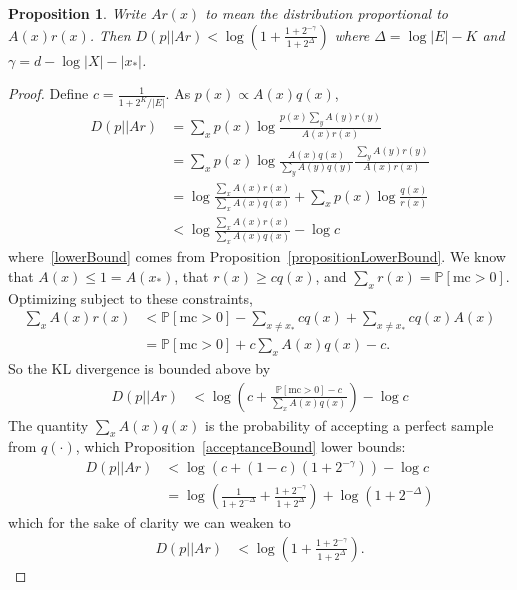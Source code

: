 \documentclass{article}
\newcommand{\Probability}{\mathds{P}} %
\newtheorem{proposition}{Proposition}
\begin{document}
  \begin{proposition}\label{mainResult}
    Write $Ar(x)$ to mean the distribution  proportional to $A(x)r(x)$. Then $D(p||Ar)<\log \left( 1 + \frac{1 + 2^{ - \gamma}}{1 + 2^\Delta}\right)$ where
    $\Delta = \log |E| - K$ and $\gamma = d - \log |X| - \lvert x_* \rvert $.
  \end{proposition}
  \begin{proof}
      Define $c=\frac{1}{1 + 2^K/|E|}$. As $p(x)\propto A(x)q(x)$,
    \begin{align}
      D(p||Ar)& = \sum_x p(x)\log \frac{p(x)\sum_y A(y)r(y)}{A(x)r(x)}\\
      & = \sum_x p(x)\log \frac{A(x)q(x)}{\sum_y A(y)q(y)}\frac{\sum_y A(y)r(y)}{A(x)r(x)} \\ %
      & = \log \frac{\sum_x A(x)r(x)}{\sum_x A(x)q(x)} + \sum_x p(x)\log \frac{q(x)}{r(x)}\\
      &  < \log \frac{\sum_x A(x)r(x)}{\sum_x A(x)q(x)} - \log c\label{lowerBound}
    \end{align}
    where~\ref{lowerBound} comes from Proposition~\ref{propositionLowerBound}.
    We know that $A(x)\leq 1 = A(x_*)$, that $r(x) \geq c q(x)$, and $\sum_x r(x) = \Probability [\text{mc} > 0 ]$.
    Optimizing subject to these constraints,
    \begin{align}
      \sum_x A(x) r(x) &  < \Probability [\text{mc} > 0] - \sum_{x\not= x_*} cq(x) +\sum_{x\not= x_*} cq(x)A(x)\nonumber\\
      & = \Probability [\text{mc} > 0 ] + c \sum_{x} A(x) q(x) - c.
    \end{align}
    So the KL divergence is bounded above by
    \begin{align}
      D(p||Ar)&  < \log \left( c + \frac{\Probability [\text{mc} > 0] -c }{\sum_x A(x)q(x)}\right) - \log c
    \end{align}
    The quantity $\sum_x A(x)q(x)$ is the probability of accepting a perfect sample from $q(\cdot )$,
    which Proposition~\ref{acceptanceBound} lower bounds:
    \begin{align}
      D(p||Ar)&  < \log \left( c + (1 -c)(1 + 2^{ - \gamma})\right) - \log c\\
      & = \log \left( \frac{1}{1 + 2^{ - \Delta}} + \frac{1 + 2^{ - \gamma}}{1 + 2^\Delta}\right)  + \log (1 + 2^{ - \Delta})
    \end{align}
    which for the sake of clarity we can weaken to%
    \begin{align}
      D(p||Ar)&  < \log \left( 1 + \frac{1 + 2^{ - \gamma}}{1 + 2^\Delta}\right) . %
    \end{align}
  \end{proof}
\end{document}
